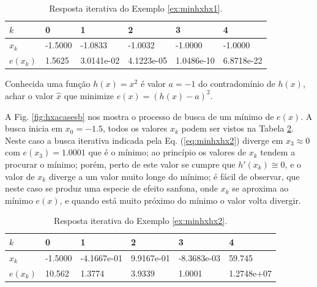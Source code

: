 \begin{table}[!h]
\centering
\begin{tabular}{|l|l|l|l|l|l|}
\hline
$k$      & 0 & 1 & 2 & 3 & 4 \\ \hline
$x_k$    & -1.5000 & -1.0833 & -1.0032 & -1.0000 & -1.0000 \\ \hline
$e(x_k)$ & 1.5625 & 3.0141e-02 & 4.1223e-05 & 1.0486e-10 & 6.8718e-22 \\ \hline
\end{tabular}
\caption{Resposta iterativa do Exemplo \ref{ex:minhxhx1}.}
\label{tab:hxacases1}
\end{table}

\begin{example}\label{ex:minhxhx2}
Conhecida uma função $h(x)=x^2$ é valor $a=-1$ do contradomínio de $h(x)$,
achar o valor $\hat{x}$ que minimize $e(x)=(h(x)-a)^2$.
\end{example}


\begin{SolutionT}\label{sol:minhxhx2}
A Fig. \ref{fig:hxacasesb} nos mostra o processo de busca de um mínimo de $e(x)$. 
A busca inicia em $x_0=-1.5$,
 todos os valores $x_{k}$ podem ser vistos na Tabela \ref{tab:hxacases2}. 
Neste caso a busca iterativa indicada pela Eq. (\ref{eq:minhxhx2}) diverge 
em $x_3\approx 0$ com $e(x_3)=1.0001$ que é o mínimo;
ao princípio os valores de $x_{k}$ tendem a procurar o mínimo; porém,
perto de este valor se cumpre que $h'(x_{k})\cong 0$, e o valor de $x_{k}$ diverge
a um valor muito longe do mínimo; é fácil de observar, que neste caso se produz 
uma especie de efeito sanfona, onde $x_{k}$ se aproxima ao mínimo $e(x)$, e quando 
está muito próximo do mínimo o valor volta divergir.
\end{SolutionT}

\begin{table}[!h]
\centering
\begin{tabular}{|l|l|l|l|l|l|}
\hline
$k$      & 0 & 1 & 2 & 3 & 4 \\ \hline
$x_k$    & -1.5000 & -4.1667e-01 & 9.9167e-01 & -8.3683e-03 & 59.745 \\ \hline
$e(x_k)$ & 10.562 & 1.3774 & 3.9339 & 1.0001 & 1.2748e+07 \\ \hline
\end{tabular}
\caption{Resposta iterativa do Exemplo \ref{ex:minhxhx2}.}
\label{tab:hxacases2}
\end{table}

